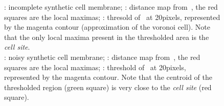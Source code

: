 \begin{figure}[h]
{%
:
 incomplete synthetic cell membrane;
:
 distance map from~,
 the red squares are the local maximas;
: 
 thresold of~ 
 at 20pixels, represented by the magenta contour (approximation of the voronoi cell).
 Note that the only local maxima present in the
 thresholded area is the \emph{cell site}.\\
%
:
 noisy synthetic cell membrane;
:
 distance map from~,
 the red squares are the local maximas;
:
 threshold of~ at 20pixels,
 represented by the magenta contour.
 Note that the centroid of the thresholded region (green square)
 is very close to the \emph{cell site} (red square).%
}
  \label{fig:incompleteMembraneSynthetic}
\end{figure}



